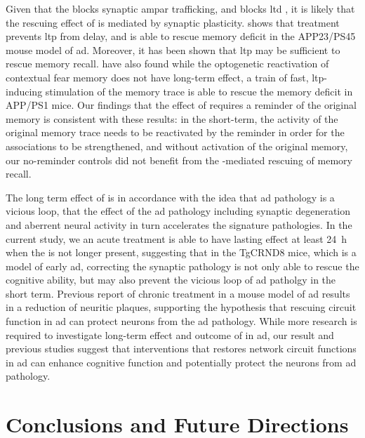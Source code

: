 Given that the \tglu blocks synaptic \gls{ampar} trafficking, and blocks \gls{ltd} , it is likely that the rescuing effect of \tglu is mediated by synaptic plasticity. \citet{dong14} shows that \tglu treatment prevents \gls{ltp} from delay, and is able to rescue memory deficit in the APP23/PS45 mouse model of \gls{ad}. Moreover, it has been shown that \gls{ltp} may be sufficient to rescue memory recall. \citet{roy16} have also found while the optogenetic reactivation of contextual fear memory does not have long-term effect, a train of fast, \gls{ltp}-inducing stimulation of the memory trace is able to rescue the memory deficit in APP/PS1 mice. Our findings that the effect of \tglu requires a reminder of the original memory is consistent with these results: in the short-term, the activity of the original memory trace needs to be reactivated by the reminder in order for the associations to be strengthened, and without activation of the original memory, our no-reminder controls did not benefit from the \tglu-mediated rescuing of memory recall.

The long term effect of \tglu is in accordance with the idea that \gls{ad} pathology is a vicious loop, that the effect of the \gls{ad} pathology including synaptic degeneration and aberrent neural activity in turn accelerates the signature pathologies. In the current study, we an acute \tglu treatment is able to have lasting effect at least \SI{24}{\hour} when the \tglu is not longer present, suggesting that in the TgCRND8 mice, which is a model of early \gls{ad}, correcting the synaptic pathology is not only able to rescue the cognitive ability, but may also prevent the vicious loop of \gls{ad} patholgy in the short term. Previous report of chronic \tglu treatment in a mouse model of \gls{ad} results in a reduction of neuritic plaques, supporting the hypothesis that rescuing circuit function in \gls{ad} can protect neurons from the \gls{ad} pathology. While more research is required to investigate long-term effect and outcome of \tglu in \gls{ad}, our result and previous studies \citep{roy16, migues16, dong14} suggest that interventions that restores network circuit functions in \gls{ad} can enhance cognitive function and potentially protect the neurons from \gls{ad} pathology. 



\chapter{Conclusions and Future Directions}

